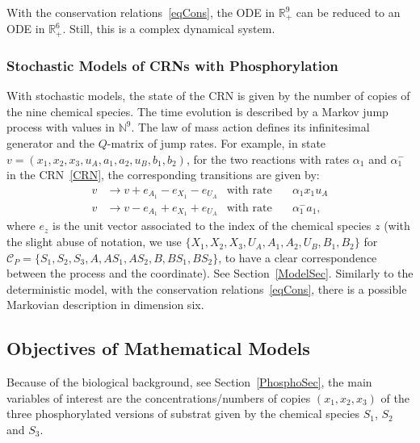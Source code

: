 \documentclass[english]{amsart}
\newcommand{\N}{\ensuremath{\mathbb{N}}}
\newcommand{\R}{\ensuremath{\mathbb{R}}}
\newcommand{\cal}[1]{\ensuremath{\mathcal{#1}}}
\numberwithin{proposition}{section}
\begin{document}
With the conservation relations~\eqref{eqCons}, the ODE in $\R_+^9$ can be reduced to an ODE in $\R_+^6$. Still, this is a complex dynamical system.

\subsubsection{Stochastic Models of CRNs with Phosphorylation}\label{StocSec}

With stochastic models, the state of the CRN is given by the number of copies of the nine chemical species. The time evolution is described by a Markov jump process with values in $\N^9$.  The law of mass action defines its infinitesimal generator and the $Q$-matrix of jump rates. For example, in state
$v{=}(x_1,x_2,x_3,u_A,a_1,a_2,u_B,b_1,b_2)$, for the two reactions with rates $\alpha_1$ and $\alpha_1^-$ in the CRN~\eqref{CRN}, the corresponding transitions are given by:
\begin{align*}
  v&\longrightarrow v{+}e_{A_1}{-}e_{X_1}{-}e_{U_A} &\text{with rate}\quad & \alpha_1x_1u_A\\
  v&\longrightarrow v{-}e_{A_1}{+}e_{X_1}{+}e_{U_A} &\text{with rate}\quad & \alpha_1^-a_1,
\end{align*}
where $e_z$ is the unit vector associated to the index of the chemical species $z$ (with the slight abuse of notation, we use $\{X_1, X_2, X_3, U_A, A_1, A_2, U_B, B_1, B_2\}$ for $\cal{C}_P=\{S_1, S_2, S_3, A, AS_1, AS_2, B, BS_1, BS_2\}$, to have a clear correspondence between the process and the coordinate). See Section~\ref{ModelSec}. Similarly to the deterministic model, with the conservation relations~\eqref{eqCons}, there is a possible Markovian description in dimension six. 

\subsection*{Objectives of Mathematical Models}
Because of the biological background, see Section~\ref{PhosphoSec},  the main variables of interest are the concentrations/numbers of copies $(x_1,x_2,x_3)$ of the three phosphorylated versions of substrat given by the chemical species ${ S}_1$, ${ S}_2$ and ${ S}_3$.
\end{document}
